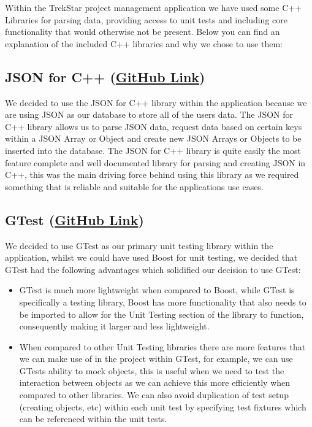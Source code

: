 \documentclass[
  english,
  a4paper,
,tablecaptionabove
]{scrartcl}
\providecommand{\tightlist}{%
  \setlength{\itemsep}{0pt}\setlength{\parskip}{0pt}}
\begin{document}
Within the TrekStar project management application we have used some C++
Libraries for parsing data, providing access to unit tests and including
core functionality that would otherwise not be present. Below you can
find an explanation of the included C++ libraries and why we chose to
use them:

\hypertarget{json-for-c-github-link}{%
\subsection{\texorpdfstring{JSON for C++
(\href{https://github.com/nlohmann/json}{GitHub
Link})}{JSON for C++ (GitHub Link)}}\label{json-for-c-github-link}}

We decided to use the JSON for C++ library within the application
because we are using JSON as our database to store all of the users
data. The JSON for C++ library allows us to parse JSON data, request
data based on certain keys within a JSON Array or Object and create new
JSON Arrays or Objects to be inserted into the database. The JSON for
C++ library is quite easily the most feature complete and well
documented library for parsing and creating JSON in C++, this was the
main driving force behind using this library as we required something
that is reliable and suitable for the applications use cases.

\hypertarget{gtest-github-link}{%
\subsection{\texorpdfstring{GTest
(\href{https://github.com/google/googletest}{GitHub
Link})}{GTest (GitHub Link)}}\label{gtest-github-link}}

We decided to use GTest as our primary unit testing library within the
application, whilst we could have used Boost for unit testing, we
decided that GTest had the following advantages which solidified our
decision to use GTest:

\begin{itemize}
\tightlist
\item
  GTest is much more lightweight when compared to Boost, while GTest is
  specifically a testing library, Boost has more functionality that also
  needs to be imported to allow for the Unit Testing section of the
  library to function, consequently making it larger and less
  lightweight.
\item
  When compared to other Unit Testing libraries there are more features
  that we can make use of in the project within GTest, for example, we
  can use GTests ability to mock objects, this is useful when we need to
  test the interaction between objects as we can achieve this more
  efficiently when compared to other libraries. We can also avoid
  duplication of test setup (creating objects, etc) within each unit
  test by specifying test fixtures which can be referenced within the
  unit tests.
\end{itemize}
\end{document}
